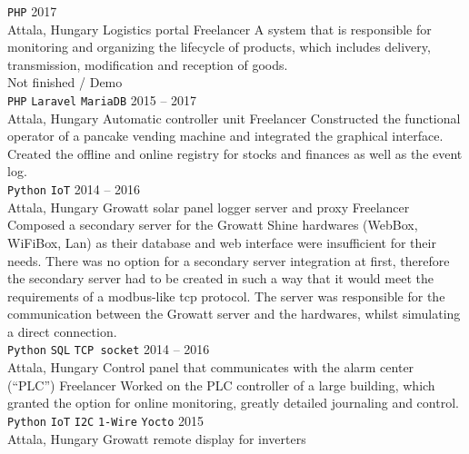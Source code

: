 \documentclass[9pt]{developercv} %
\begin{document}
\begin{entrylist}
{            \texttt{PHP}
        }
    \entry
        {2017 \\ Attala, Hungary}
        {Logistics portal}
        {Freelancer}
        {A system that is responsible for monitoring and organizing the lifecycle of products, which includes delivery,
            transmission, modification and reception of goods.\\
            Not finished / Demo \\
            \texttt{PHP}\slashsep
            \texttt{Laravel}\slashsep
            \texttt{MariaDB}
        }
    \entry
        {2015 -- 2017 \\ Attala, Hungary}
        {Automatic controller unit}
        {Freelancer}
        {Constructed the functional operator of a pancake vending machine and integrated the graphical interface. Created the
            offline and online registry for stocks and finances as well as the event log.\\
            \texttt{Python}\slashsep
            \texttt{IoT}
        }
    \entry
        {2014 -- 2016 \\ Attala, Hungary}
        {Growatt solar panel logger server and proxy}
        {Freelancer}
        {Composed a secondary server for the Growatt Shine hardwares (WebBox, WiFiBox, Lan) as their database and web
            interface were insufficient for their needs. There was no option for a secondary server integration at first, therefore the
            secondary server had to be created in such a way that it would meet the requirements of a modbus-like tcp protocol.
            The server was responsible for the communication between the Growatt server and the hardwares, whilst simulating a
            direct connection. \\
            \texttt{Python}\slashsep
            \texttt{SQL}\slashsep
            \texttt{TCP socket}
        }
    \entry
        {2014 -- 2016 \\ Attala, Hungary}
        {Control panel that communicates with the alarm center (“PLC”)}
        {Freelancer}
        {Worked on the PLC controller of a large building, which granted the option for online monitoring, greatly detailed
            journaling and control. \\ 
            \texttt{Python}\slashsep
            \texttt{IoT}\slashsep
            \texttt{I2C}\slashsep
            \texttt{1-Wire}\slashsep
            \texttt{Yocto}
        }
    \entry
        {2015 \\ Attala, Hungary}
        {Growatt remote display for inverters}

\end{entrylist}
\end{document}
